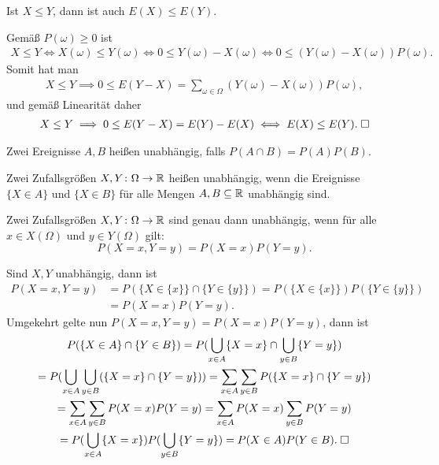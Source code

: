 \begin{Korollar} Ist $X\le Y$, dann ist auch $E(X)\le E(Y)$.
\end{Korollar}
 Gemäß $P(\omega)\ge 0$ ist
\begin{gather*}
X\le Y\iff X(\omega)\le Y(\omega)\iff 0\le Y(\omega)-X(\omega)
\iff 0\le (Y(\omega)-X(\omega))P(\omega).
\end{gather*}
Somit hat man
\begin{gather*}
X\le Y\implies 0\le E(Y-X) = \sum_{\omega\in\Omega} (Y(\omega)-X(\omega))P(\omega),
\end{gather*}
und gemäß Linearität daher
\begin{gather*}
X\le Y\implies 0\le E(Y-X) = E(Y)-E(X) \iff E(X)\le E(Y).\;\square
\end{gather*}

\begin{Definition}%
\newlinefirst
Zwei Ereignisse $A,B$ heißen unabhängig, falls $P(A\cap B)=P(A)P(B)$.
\end{Definition}

\begin{Definition}%
\newlinefirst
Zwei Zufallsgrößen $X,Y\colon\Omega\to\mathbb R$ heißen unabhängig, wenn
die Ereignisse $\{X\in A\}$ und $\{X\in B\}$
für alle Mengen $A,B\subseteq\mathbb R$ unabhängig sind.
\end{Definition}

\begin{Satz}
Zwei Zufallsgrößen $X,Y\colon\Omega\to\mathbb R$ sind genau dann unabhängig,
wenn für alle $x\in X(\Omega)$ und $y\in Y(\Omega)$ gilt:
\[P(X=x,Y=y)= P(X=x)P(Y=y).\]
\end{Satz}
 Sind $X,Y$ unabhängig, dann ist
\begin{align*}
P(X=x,Y=y) &= P(\{X\in\{x\}\}\cap\{Y\in\{y\}\})
= P(\{X\in\{x\}\})P(\{Y\in\{y\}\})\\
&= P(X=x)P(Y=y).
\end{align*}
Umgekehrt gelte nun $P(X=x,Y=y)=P(X=x)P(Y=y)$, dann ist
\begin{gather*}
P(\{X\in A\}\cap\{Y\in B\})
= P(\bigcup_{x\in A}\{X=x\}\cap\bigcup_{y\in B}\{Y=y\})\\
= P(\bigcup_{x\in A}\bigcup_{y\in B}(\{X=x\}\cap\{Y=y\}))
= \sum_{x\in A}\sum_{y\in B}P(\{X=x\}\cap\{Y=y\})\\
= \sum_{x\in A}\sum_{y\in B}P(X=x)P(Y=y)
= \sum_{x\in A}P(X=x)\sum_{y\in B}P(Y=y)\\
= P(\bigcup_{x\in A}\{X=x\})P(\bigcup_{y\in B}\{Y=y\})
= P(X\in A)P(Y\in B).\;\square
\end{gather*}

